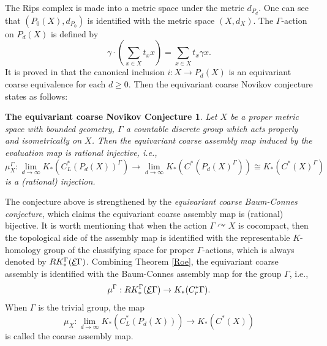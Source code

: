 \documentclass[11pt]{article}
\theoremstyle{definition}
\theoremstyle{plain}
\newtheorem*{ECNcon}{The equivariant coarse Novikov Conjecture}
\def\EG{\underline{\E}\Gamma}
\def\Ga{\Gamma}
\def\car{\curvearrowright}
\begin{document}
The Rips complex is made into a metric space under the metric $d_{P_d}$. One can see that $(P_0(X),d_{P_0})$ is identified with the metric space $(X,d_X)$. The $\Ga$-action on $P_d(X)$ is defined by
$$\gamma\cdot\left(\sum_{x\in X}t_xx\right)=\sum_{x\in X}t_x\gamma x.$$
It is proved in \cite{HIT2020} that the canonical inclusion $i: X\to P_d(X)$ is an equivariant coarse equivalence for each $d\geq0$. Then the equivariant coarse Novikov conjecture states as follows:

\begin{ECNcon}
Let $X$ be a proper metric space with bounded geometry, $\Ga$ a countable discrete group which acts properly and isometrically on $X$. Then the equivariant coarse assembly map induced by the evaluation map is rational injective, i.e.,
$$\mu_X^{\Ga}:\lim_{d\to\infty}K_*(C^*_L(P_d(X))^{\Ga})\to\lim_{d\to\infty}K_*(C^*(P_d(X)^{\Ga}))\cong K_*(C^*(X)^{\Ga})$$
is a (rational) injection.
\end{ECNcon}

The conjecture above is strengthened by the \emph{equivariant coarse Baum-Connes conjecture}, which claims the equivariant coarse assembly map is (rational) bijective. It is worth mentioning that when the action $\Ga\car X$ is cocompact, then the topological side of the assembly map is identified with the representable $K$-homology group of the classifying space for proper $\Ga$-actions, which is always denoted by $RK_*^{\Ga}(\EG)$. Combining Theorem \ref{Roe}, the equivariant coarse assembly is identified with the Baum-Connes assembly map for the group $\Ga$, i.e.,
$$\mu^{\Ga}:RK^{\Ga}_*(\EG)\to K_*(C^*_r\Ga).$$
When $\Ga$ is the trivial group, the map
$$\mu_X:\lim_{d\to\infty}K_*(C^*_L(P_d(X)))\to K_*(C^*(X))$$
is called the coarse assembly map.
\end{document}
